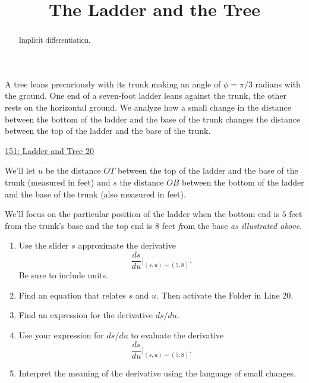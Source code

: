 \documentclass{ximera}
\title{The Ladder and the Tree}
\begin{document}
\begin{abstract}
Implicit differentiation.
\end{abstract}
\maketitle

\begin{question} \label{Q43hhbnhhnnzzz}

A tree leans precariously with its trunk making an angle of $\phi = \pi/3$ radians with the ground. One end of a seven-foot ladder leans against the trunk, the other rests on the horizontal ground. We analyze how a small change in the distance between the bottom of the ladder and the base of the trunk changes the distance between the top of the ladder and the base of the trunk.


 
\begin{onlineOnly}
   \begin{center}
\end{center}
\end{onlineOnly}

\href{https://www.desmos.com/calculator/yojvjynme4}{151: Ladder and Tree 20}

We'll let $u$ be the distance $OT$ between the top of the ladder and the base of the trunk (measured in feet) and  $s$ the distance $OB$ between the bottom of the ladder and the base of the trunk (also measured in feet).



We'll focus on the particular position of the ladder when the bottom end is $5$ feet from the trunk's base and the top end is $8$ feet \emph from the base \emph{as illustrated above}.

\begin{enumerate}

\item Use the slider $s$ approximate the derivative
\[
\frac{ds}{du}\Big|_{(s,u)\sim (5,8)} .
\]
Be sure to include units.

\item Find an equation that relates $s$ and $u$. Then activate the Folder in Line 20.

\item Find an expression for the derivative $ds/du$.

\item Use your expression for $ds/du$ to evaluate the derivative
\[
\frac{ds}{du}\Big|_{(s,u)\sim (5,8)} .
\]

\item Interpret the meaning of the derivative using the language of small changes.


\end{enumerate}

\end{question}
\end{document}
